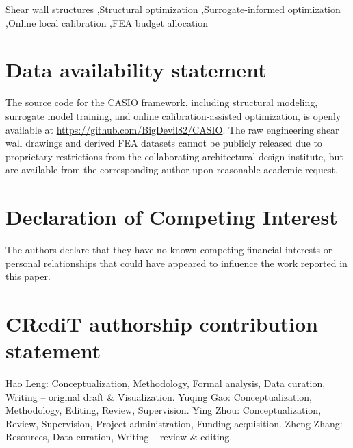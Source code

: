 \documentclass[final,5p,times,twocolumn, fleqn]{elsarticle}
\begin{document}
\begin{frontmatter}
\begin{keyword}
Shear wall structures \sep Structural optimization \sep Surrogate-informed optimization \sep Online local calibration \sep FEA budget allocation
\end{keyword}

\end{frontmatter}

\linenumbers







\section*{Data availability statement}
The source code for the CASIO framework, including structural modeling, surrogate model training, and online calibration-assisted optimization, is openly available at \url{https://github.com/BigDevil82/CASIO}. The raw engineering shear wall drawings and derived FEA datasets cannot be publicly released due to proprietary restrictions from the collaborating architectural design institute, but are available from the corresponding author upon reasonable academic request.

\section*{Declaration of Competing Interest}
The authors declare that they have no known competing financial interests or personal relationships that could have appeared to influence the work reported in this paper.

\section*{CRediT authorship contribution statement}
Hao Leng: Conceptualization, Methodology, Formal analysis, Data curation, Writing -- original draft \& Visualization. Yuqing Gao: Conceptualization, Methodology, Editing, Review, Supervision. Ying Zhou: Conceptualization, Review, Supervision, Project administration, Funding acquisition. Zheng Zhang: Resources, Data curation, Writing -- review \& editing.
\end{document}
